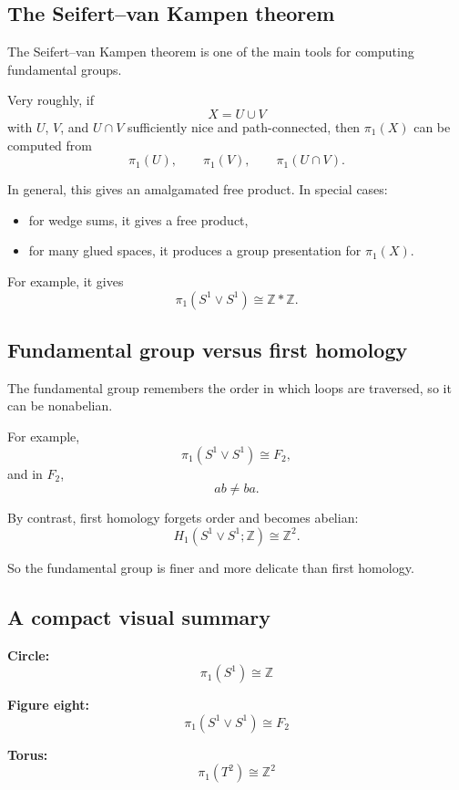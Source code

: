 \documentclass[12pt,a4paper]{article}
\theoremstyle{notespace}
\begin{document}
\bigskip

\subsection{The Seifert--van Kampen theorem}

The Seifert--van Kampen theorem is one of the main tools for computing fundamental groups.

Very roughly, if
\[
X=U\cup V
\]
with \(U\), \(V\), and \(U\cap V\) sufficiently nice and path-connected, then \(\pi_1(X)\) can be computed from
\[
\pi_1(U),\qquad \pi_1(V),\qquad \pi_1(U\cap V).
\]

In general, this gives an amalgamated free product. In special cases:
\begin{itemize}
	\item for wedge sums, it gives a free product,
	\item for many glued spaces, it produces a group presentation for \(\pi_1(X)\).
\end{itemize}

For example, it gives
\[
\pi_1(S^1\vee S^1)\cong \mathbb Z*\mathbb Z.
\]

\bigskip

\subsection{Fundamental group versus first homology}

The fundamental group remembers the order in which loops are traversed, so it can be nonabelian.

For example,
\[
\pi_1(S^1\vee S^1)\cong F_2,
\]
and in \(F_2\),
\[
ab\neq ba.
\]

By contrast, first homology forgets order and becomes abelian:
\[
H_1(S^1\vee S^1;\mathbb Z)\cong \mathbb Z^2.
\]

So the fundamental group is finer and more delicate than first homology.

\bigskip

\subsection{A compact visual summary}

\textbf{Circle:}
\[
\pi_1(S^1)\cong \mathbb Z
\]

\textbf{Figure eight:}
\[
\pi_1(S^1\vee S^1)\cong F_2
\]

\textbf{Torus:}
\[
\pi_1(T^2)\cong \mathbb Z^2
\]
\end{document}
